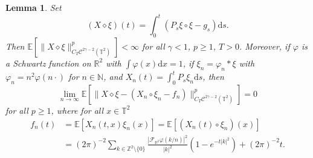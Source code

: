\documentclass[a4paper,11pt]{article}
\newcommand{\mathd}{\mathrm{d}}
\newtheorem{lemma}{Lemma}
{\theorembodyfont{\rmfamily}\newtheorem{remark}{Remark}}
\newcommand{\CF}{\mathscr{F}}
\newcommand{\CC}{\mathscr{C}}
\newcommand{\reso}{\,\mathord{\circ}\,}
\newcommand{\renorm}{\,\mathord{\diamond}\,}
\begin{document}
\begin{lemma}
  \label{lem:pam area}Set
  \[ (X \renorm \xi) (t) = \int_0^t (P_s \xi \reso \xi - g_s) \mathd s. \]
  Then $\mathbb{E} [\|X \renorm \xi \|_{C_T \CC^{2 \gamma - 2}
  (\mathbb{T}^2)}^p] < \infty$ for all $\gamma < 1$, $p \ge 1$, $T > 0$.
  Moreover, if $\varphi$ is a Schwartz function on $\mathbb{R}^2$ with $\int
  \varphi (x) \mathd x = 1$, if $\xi_n = \varphi_n \ast \xi$ with $\varphi_n =
  n^2 \varphi (n \cdot)$ for $n \in \mathbb{N}$, and $X_n (t) =
  \int_0^{t} P_s \xi_n \mathd s$, then
  \[ \lim_{n \rightarrow \infty} \mathbb{E} [\|X \renorm \xi - (X_n \reso
     \xi_n - f_n)\|_{C_T \CC^{2 \gamma - 2} (\mathbb{T}^2)}^p] = 0 \]
  for all $p \ge 1$, where for all $x \in \mathbb{T}^2$
  \begin{align*}
    f_n (t) & =  \mathbb{E} [X_n (t, x) \xi_n (x)] =\mathbb{E} [(X_n (t)
    \reso \xi_n) (x)]  \\
    & =  (2 \pi)^{- 2} \sum_{k \in \mathbb{Z}^2 \setminus \{ 0 \}} \frac{|
    \CF_{\mathbb{R}^2} \varphi (k / n) |^2}{|k|^2} (1 - e^{- t | k |^2}) + (2
    \pi)^{- 2} t.  
  \end{align*}
\end{lemma}
\end{document}
